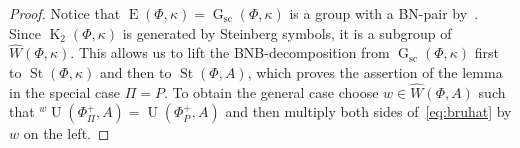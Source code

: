 \documentclass[oneside, 10pt]{amsart}
\DeclareMathOperator{\St}{St}
\DeclareMathOperator{\E}{E}
\DeclareMathOperator{\G}{G}
\DeclareMathOperator{\UU}{U}
\newcommand{\Gsc}{\G_\mathrm{sc}}
\DeclareMathOperator{\K}{K}
\newcommand{\StW}{\widehat{W}}
\newcommand{\StH}{\widehat{H}}
\numberwithin{equation}{section}
\numberwithin{thm}{section}
\numberwithin{lemma}{section}
\theoremstyle{definition}
\theoremstyle{remark}
\begin{document}
\begin{proof}
Notice that $\E(\Phi, \kappa) = \Gsc(\Phi, \kappa)$ is a group with a BN-pair by~\cite[\S~4]{Ge17}.
Since $\K_2(\Phi, \kappa)$ is generated by Steinberg symbols, it is a subgroup of $\StW(\Phi, \kappa)$.
This allows us to lift the BNB-decomposition from $\Gsc(\Phi, \kappa)$ first to $\St(\Phi, \kappa)$ and then to $\St(\Phi, A)$,
which proves the assertion of the lemma in the special case $\Pi = P$.
To obtain the general case choose $w \in \StW(\Phi, A)$ such that ${}^w \UU(\Phi^+_\Pi, A) = \UU(\Phi^+_{P}, A)$ and then multiply both sides of~\eqref{eq:bruhat} by $w$ on the left.
\begin{comment}
Let us verify the second assertion.
Projecting the equality~\eqref{eq:bwb-eq} to $\Gsc(\Phi, \kappa)$ and using the fact that double B-cosets are disjoint we obtain that
$\overline{w} = \overline{w'}$.
Since $\K_2(\Phi, \kappa)$ is generated by Steinberg symbols, the image of $w^{-1}w'$ in $\St(\Phi, \kappa)$ belongs to $\StH(\Phi, \kappa)$,
hence
\begin{multline*} w^{-1}w' \in \left(\StH(\Phi, A) \cdot \overline{\St}(\Phi, A, M)\right) \cdot \StW(\Phi, A) \subseteq \\ \subseteq
\left( \UU(\Phi^+, M) \cdot \StH(\Phi, A) \cdot \UU(\Phi^-, M)\right) \cap \StW(\Phi, A) \subseteq \StH(\Phi, A). \end{multline*}
Here the first inclusion follows from~\cite[Theorem~2.4]{Ste73} and the second inclusion is clear from consideration of matrices.

\[w^{-1} w' \in \bigl(\StH(\Phi, A) \cdot \overline{\St}(\Phi, A, M)\bigr)\cap \StW(\Phi, A) \subseteq \StH(\Phi, A).\]
Here we use the fact that $\K_2(\Phi, A)$ is generated by Steinberg symbols, see e.\,g.~\cite[Theorem~2.5]{Ste73}.
\end{comment}
\end{proof}
\end{document}
